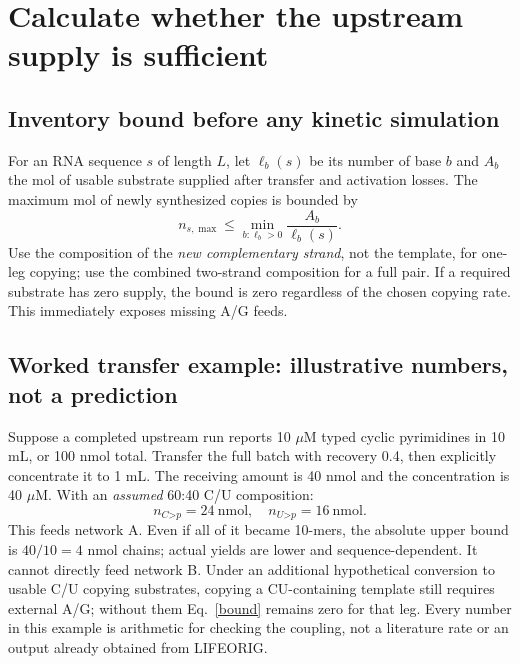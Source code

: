 \documentclass[11pt]{article}
\newcommand{\cp}{\mathord{>}p}
\begin{document}
\section{Calculate whether the upstream supply is sufficient}
\subsection{Inventory bound before any kinetic simulation}
For an RNA sequence $s$ of length $L$, let $\ell_b(s)$ be its number of base $b$
and $A_b$ the mol of usable substrate supplied after transfer and activation
losses. The maximum mol of newly synthesized copies is bounded by
\begin{equation}
n_{s,\max}\le\min_{b:\ell_b>0}\frac{A_b}{\ell_b(s)}.
\label{bound}
\end{equation}
Use the composition of the \emph{new complementary strand}, not the template,
for one-leg copying; use the combined two-strand composition for a full pair.
If a required substrate has zero supply, the bound is zero regardless of the
chosen copying rate. This immediately exposes missing A/G feeds.

\subsection{Worked transfer example: illustrative numbers, not a prediction}
Suppose a completed upstream run reports 10 $\mu$M typed cyclic pyrimidines in
10 mL, or 100 nmol total. Transfer the full batch with recovery 0.4, then
explicitly concentrate it to 1 mL. The receiving amount is 40 nmol and the
concentration is 40 $\mu$M. With an \emph{assumed} 60:40 C/U composition:
\begin{equation}
n_{C\cp}=24\ \mathrm{nmol},\quad n_{U\cp}=16\ \mathrm{nmol}.
\end{equation}
This feeds network A. Even if all of it became 10-mers, the absolute upper
bound is $40/10=4$ nmol chains; actual yields are lower and sequence-dependent.
It cannot directly feed network B. Under an additional hypothetical conversion
to usable C/U copying substrates, copying a CU-containing template still
requires external A/G; without them Eq.~\eqref{bound} remains zero for that leg.
Every number in this example is arithmetic for checking the coupling, not a
literature rate or an output already obtained from LIFEORIG.
\end{document}
